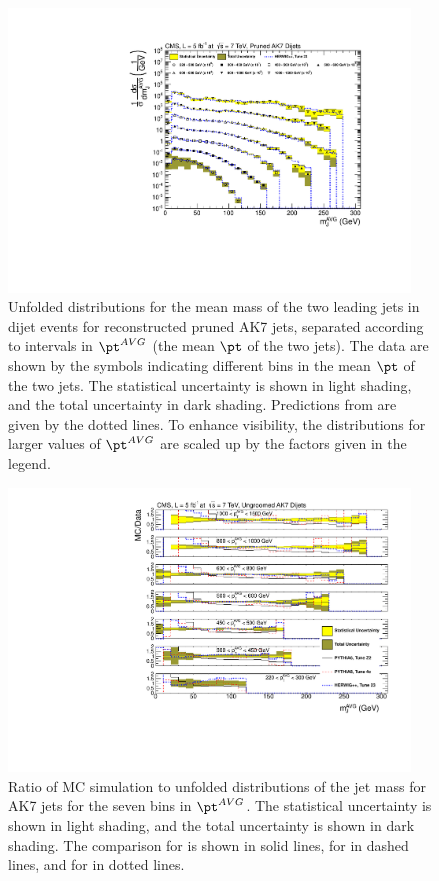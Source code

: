 \begin{figure}[htbp]
\centering
\includegraphics[width=0.95\textwidth]{figs/unfoldedMeasurementDijets_all__Pruned}
\caption{Unfolded distributions for the mean mass of the two leading jets in dijet events for reconstructed pruned AK7 jets,
separated according to intervals in $\pt^{AVG}$ (the mean $\pt$ of the two jets).
The data are shown by the symbols indicating different bins in the mean $\pt$ of the two jets. 
The statistical uncertainty is shown in light shading, and the
total uncertainty in dark shading. 
Predictions
from \HERWIG are given by the dotted lines. 
To enhance visibility, the distributions for larger values of $\pt^{AVG}$ 
are scaled up by the factors given in the legend. 
\label{figs:unfoldedMeasurementDijets_all_Pruned}}
\end{figure}

\begin{figure}[htbp]
\centering
\includegraphics[width=0.95\textwidth]{figs/unfoldedMeasurementDijets_allfrac_}
\caption{Ratio of MC simulation to unfolded distributions of the jet mass for AK7 jets for the seven bins in $\pt^{AVG}$.
The statistical uncertainty is shown in light shading, and the
total uncertainty is shown in dark shading.
The comparison for \PYTHIA is shown in solid lines, for \PYTHIAEIGHT in dashed lines, and for \HERWIG in dotted lines.
\label{figs:unfoldedMeasurementDijets_allfrac}}
\end{figure}


